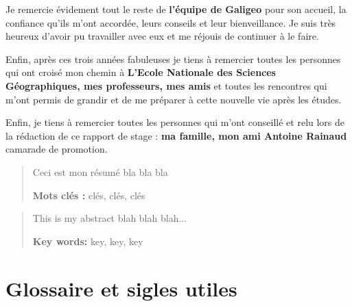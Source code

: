 \documentclass{themeensg}
\begin{document}
Je remercie évidement tout le reste de \textbf{l’équipe de Galigeo} pour son accueil, la confiance qu’ils m’ont accordée, leurs conseils et leur bienveillance. Je suis très heureux d’avoir pu travailler avec eux et me réjouis de continuer à le faire.

Enfin, après ces trois années fabuleuses je tiens à remercier toutes les personnes qui ont croisé mon chemin à \textbf{L’Ecole Nationale des Sciences Géographiques, mes professeurs, mes amis} et toutes les rencontres qui m’ont permis de grandir et de me préparer à cette nouvelle vie après les études.

Enfin, je tiens à remercier toutes les personnes qui m'ont conseillé et relu lors de la rédaction de ce rapport de stage : \textbf{ma famille, mon ami Antoine Rainaud} camarade de promotion.



\begin{abstract}
\thispagestyle{empty}
	\vspace{1cm}

	Ceci est mon résumé bla bla bla
	
	\vspace{1.5cm}
	
	\textbf{Mots clés :} clés, clés, clés
\end{abstract}


\begin{abstract}
\thispagestyle{empty}
	\vspace{1cm}
	
	This is my abstract blah blah blah...
	
	\vspace{1.5cm}
	
	\textbf{Key words:} key, key, key
\end{abstract}


\tableofcontents



\newevenpage
\chapter*{Glossaire et sigles utiles}

  \begin{acronym}
  \end{acronym}
\end{document}
